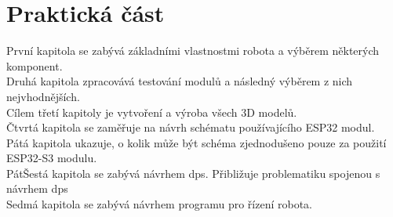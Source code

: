\chapter{Praktická část}
První kapitola se zabývá základními vlastnostmi robota a výběrem některých komponent.\\

Druhá kapitola zpracovává testování modulů a následný výběrem z nich nejvhodnějších.\\

Cílem třetí kapitoly je vytvoření a výroba všech 3D modelů.\\

Čtvrtá kapitola se zaměřuje na návrh schématu používajícího ESP32 modul.\\

Pátá kapitola ukazuje, o kolik může být schéma zjednodušeno pouze za použití ESP32-S3 modulu.\\

PátŠestá kapitola se zabývá návrhem \ac{dps}. Přibližuje problematiku spojenou s návrhem \ac{dps}\\

Sedmá kapitola se zabývá návrhem programu pro řízení robota.\\